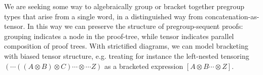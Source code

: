 



We are seeking some way to algebraically group or bracket together pregroup types that arise from a single word, in a distinguished way from concatenation-as-tensor. In this way we can preserve the structure of pregroup-sequent proofs: grouping indicates a node in the proof-tree, while tensor indicates parallel composition of proof trees. With strictified diagrams, we can model bracketing with biased tensor structure, e.g. treating for instance the left-nested tensoring $(\cdots((A \otimes B) \otimes C) \cdots \otimes \cdots Z)$ as a bracketed expression $[A \otimes B \cdots \otimes Z]$.

